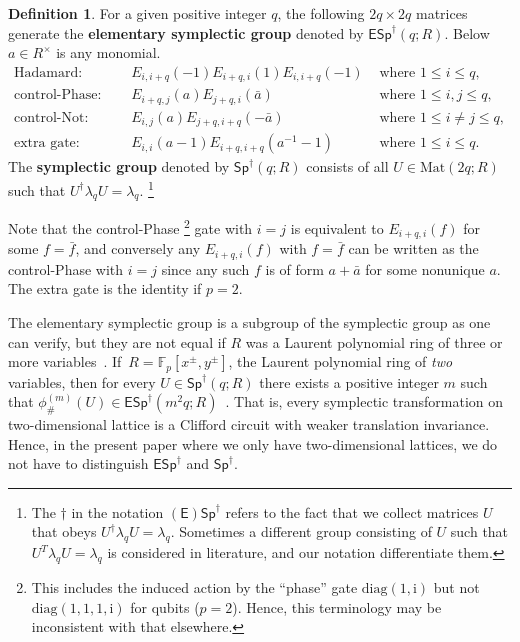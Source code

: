 \documentclass[aps,pra,
floatfix,notitlepage,
nofootinbib,
longbibliography,11pt]{revtex4-1}
\theoremstyle{definition}
\newtheorem{definition}[lemma]{Definition}
\newcommand{\FF}{{\mathbb{F}}}
\newcommand{\cg}[1]{{\phi_\#^{({#1})}}}
\newcommand{\imag}{\mathrm{i}}
\newcommand{\Sp}{{\mathsf{Sp}^\dagger}}
\newcommand{\ESp}{{\mathsf{ESp}^\dagger}}
\begin{document}
\begin{definition}\label{def:ESp}
For a given positive integer $q$,
the following $2q \times 2q$ matrices generate the 
{\bf elementary symplectic group} denoted by $\ESp(q;R)$.
Below $a \in R^\times$ is any monomial.
\begin{align}
 \text{Hadamard: } \quad&E_{i,i+q}(-1) E_{i+q,i}(1) E_{i,i+q}(-1) &\text{ where } 1 \le i \le q,\nonumber\\
 \text{control-Phase: }\quad & E_{i+q,j}(a)E_{j+q,i}(\bar a)&\text{ where } 1 \le i,j \le q,\nonumber \\
 \text{control-Not: } \quad & E_{i,j}(a) E_{j+q,i+q}(-\bar a) &\text{ where }1 \le i \ne j \le q, \nonumber \\
\text{extra gate: } \quad & E_{i,i}(a-1) E_{i+q,i+q}(a^{-1}-1) & \text{ where } 1 \le i \le q. \nonumber
\end{align}
The {\bf symplectic group} denoted by $\Sp(q;R)$ consists of 
all $U \in \mathrm{Mat}(2q;R)$ such that $U^\dagger \lambda_q U = \lambda_q$.%
\footnote{
The $\dagger$ in the notation $(\mathsf{E})\Sp$ refers to the fact that
we collect matrices $U$ that obeys $U^\dagger \lambda_q U = \lambda_q$.
Sometimes a different group consisting of $U$ such that $U^T \lambda_q U = \lambda_q$
is considered in literature, and our notation differentiate them.
}
\end{definition}
Note that the control-Phase%
\footnote{
This includes the induced action by the ``phase'' gate 
$\mathrm{diag}(1,\imag)$ but not $\mathrm{diag}(1,1,1,\imag)$ for qubits ($p=2$).
Hence, this terminology may be inconsistent with that elsewhere.
}
gate with $i = j$ is equivalent to $E_{i+q,i}(f)$ for some $f = \bar f$,
and conversely any $E_{i+q,i}(f)$ with $f = \bar f$ can be written as the control-Phase with $i=j$
since any such $f$ is of form $a + \bar a$ for some nonunique $a$.
The extra gate is the identity if $p=2$.

The elementary symplectic group is a subgroup of the symplectic group as one can verify,
but they are not equal if $R$ was a Laurent polynomial ring of three or more variables~\cite{haah2019clifford}.
If~$R = \FF_p[x^\pm, y^\pm]$, the Laurent polynomial ring of \emph{two} variables,
then for every $U \in \Sp(q;R)$ there exists a positive integer $m$ such that $\cg{m}(U) \in \ESp(m^2 q;R)$~\cite{haah2019clifford}.
That is, every symplectic transformation on two-dimensional lattice is a Clifford circuit with weaker translation invariance.
Hence, in the present paper where we only have two-dimensional lattices,
we do not have to distinguish $\ESp$ and $\Sp$.
\end{document}
